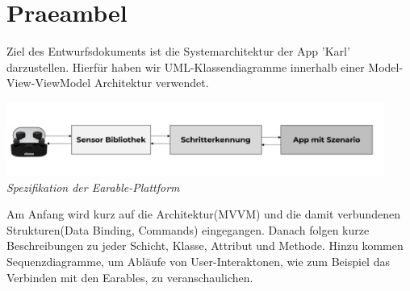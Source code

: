 \documentclass[../entwurf.tex]{subfiles}
\begin{document}
\maketitle
\tableofcontents

\clearpage
\section{Praeambel}
Ziel des Entwurfsdokuments ist die Systemarchitektur der App 'Karl' darzustellen. Hierfür haben wir UML-Klassendiagramme innerhalb einer Model-View-ViewModel Architektur verwendet.

	\begin{center}
		\includegraphics[page=1,width=350pt,keepaspectratio]{../graphics/Praeambel/YHB_Project_Pic.png}
		\textit{Spezifikation der Earable-Plattform }
	\end{center}

Am Anfang wird kurz auf die Architektur(MVVM) und die damit verbundenen Strukturen(Data Binding, Commands) eingegangen. Danach folgen kurze Beschreibungen zu jeder Schicht, Klasse, Attribut und Methode. Hinzu kommen Sequenzdiagramme, um Abläufe von User-Interaktonen, wie zum Beispiel das Verbinden mit den Earables, zu veranschaulichen.
\end{document}
